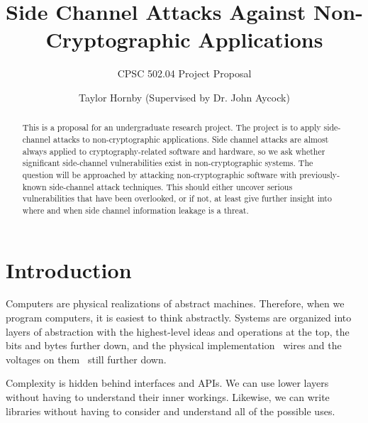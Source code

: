 \documentclass{acm_proc_article-sp}
\begin{document}
\sloppy

\title{Side Channel Attacks Against Non-Cryptographic Applications}
\subtitle{CPSC 502.04 Project Proposal}


\author{
\alignauthor
Taylor Hornby (Supervised by Dr. John Aycock)\\
}


\maketitle

\begin{abstract}
This is a proposal for an undergraduate research project. The project is to
apply side-channel attacks to non-cryptographic applications. Side channel
attacks are almost always applied to cryptography-related software and hardware,
so we ask whether significant side-channel vulnerabilities exist in
non-cryptographic systems. The question will be approached by attacking
non-cryptographic software with previously-known side-channel attack techniques.
This should either uncover serious vulnerabilities that have been overlooked, or
if not, at least give further insight into where and when side channel
information leakage is a threat.
\end{abstract}

\section{Introduction}
\label{sec:attacks}

Computers are physical realizations of abstract machines. Therefore, when we
program computers, it is easiest to think abstractly. Systems are organized into
layers of abstraction with the highest-level ideas and operations at the top,
the bits and bytes further down, and the physical implementation \textendash\
wires and the voltages on them \textendash\ still further down.

Complexity is hidden behind interfaces and APIs. We can use lower layers without
having to understand their inner workings. Likewise, we can write libraries
without having to consider and understand all of the possible uses.
\end{document}
